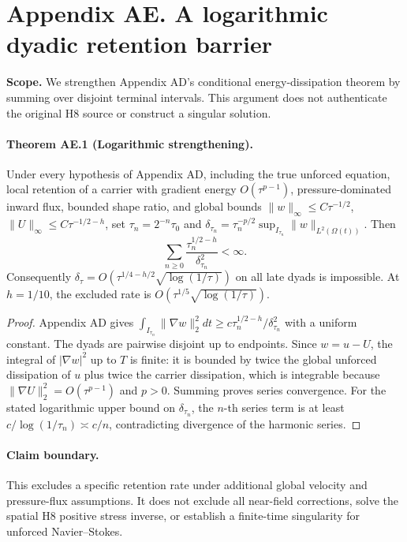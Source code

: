 \clearpage
\section*{Appendix AE. A logarithmic dyadic retention barrier}
\noindent\textbf{Scope.} We strengthen Appendix AD's conditional energy-dissipation theorem by summing over disjoint terminal intervals. This argument does not authenticate the original H8 source or construct a singular solution.

\paragraph{Theorem AE.1 (Logarithmic strengthening).}
Under every hypothesis of Appendix AD, including the true unforced equation, local retention of a carrier with gradient energy $O(\tau^{p-1})$, pressure-dominated inward flux, bounded shape ratio, and global bounds $\|w\|_\infty\le C\tau^{-1/2}$, $\|U\|_\infty\le C\tau^{-1/2-h}$, set $\tau_n=2^{-n}\tau_0$ and $\delta_{\tau_n}=\tau_n^{-p/2}\sup_{I_{\tau_n}}\|w\|_{L^2(\Omega(t))}$. Then
\[
\boxed{\sum_{n\ge0}\frac{\tau_n^{1/2-h}}{\delta_{\tau_n}^2}<\infty.}
\]
Consequently $\delta_\tau=O(\tau^{1/4-h/2}\sqrt{\log(1/\tau)})$ on all late dyads is impossible. At $h=1/10$, the excluded rate is $O(\tau^{1/5}\sqrt{\log(1/\tau)})$.

\begin{proof}
Appendix AD gives $\int_{I_{\tau_n}}\|\nabla w\|_2^2dt\ge c\tau_n^{1/2-h}/\delta_{\tau_n}^2$ with a uniform constant. The dyads are pairwise disjoint up to endpoints. Since $w=u-U$, the integral of $|\nabla w|^2$ up to $T$ is finite: it is bounded by twice the global unforced dissipation of $u$ plus twice the carrier dissipation, which is integrable because $\|\nabla U\|_2^2=O(\tau^{p-1})$ and $p>0$. Summing proves series convergence. For the stated logarithmic upper bound on $\delta_{\tau_n}$, the $n$-th series term is at least $c/\log(1/\tau_n)\asymp c/n$, contradicting divergence of the harmonic series.
\end{proof}

\paragraph{Claim boundary.}
This excludes a specific retention rate under additional global velocity and pressure-flux assumptions. It does not exclude all near-field corrections, solve the spatial H8 positive stress inverse, or establish a finite-time singularity for unforced Navier--Stokes.
